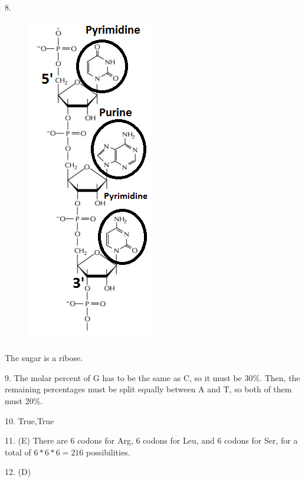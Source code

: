 \documentclass{article}
\begin{document}
8. \begin{figure}[h]
  \centering
 \includegraphics[scale=0.6]{P8.png}
\end{figure}

The sugar is a ribose.
\vspace{5mm}

9. The molar percent of G has to be the same as C, so it must be 30\%. Then, the remaining percentages must be split equally between A and T, so both of them must 20\%.
\vspace{5mm}

10. True,True
\vspace{5mm}

11. (E) There are 6 codons for Arg, 6 codons for Leu, and 6 codons for Ser, for a total of $6*6*6=216$ possibilities.
\vspace{5mm}

12. (D)
\vspace{5mm}
\end{document}
